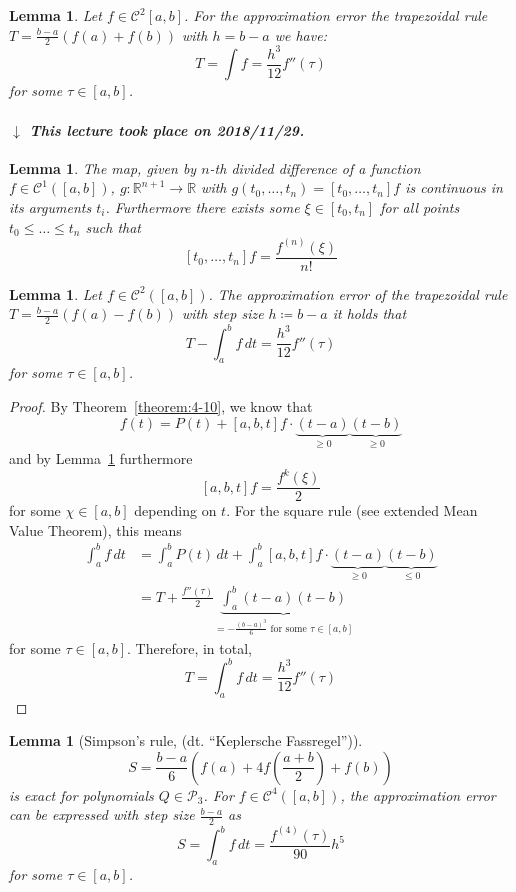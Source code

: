 \documentclass[a4paper]{article}
\newcounter{lecref}[section]
\numberwithin{lecref}{section}
\theoremstyle{break}
\newtheorem{lemma}[lecref]{Lemma}
\newtheorem*{Lemma}{Lemma}
\newcommand{\dateref}[1]{%
  \begin{mdframed}[backgroundcolor=gray!10,innerbottommargin=0pt,innertopmargin=0pt]
    \paragraph{\textit{$\downarrow$ This lecture took place on #1.}}%
  \end{mdframed}%
}
\newcommand{\dt}[1]{(dt. \enquote{\foreignlanguage{german}{#1}})}
\begin{document}
\begin{Lemma}
  \label{lemma:5-6}
  Let $f \in \mathcal C^2[a, b]$.
  For the approximation error the trapezoidal rule $T = \frac{b-a}{2} (f(a) + f(b))$ with $h = b - a$ we have:
  \[ T = \int f = \frac{h^3}{12} f''(\tau) \]
  for some $\tau \in [a, b]$.
\end{Lemma}

\dateref{2018/11/29}

\begin{lemma}
  \label{lemma:5-6}
  The map, given by $n$-th divided difference of a function $f \in \mathcal C^1([a, b])$, $g: \mathbb R^{n + 1} \to \mathbb R$ with $g(t_0, \dots, t_n) = [t_0, \dots, t_n] f$ is continuous in its arguments $t_i$. Furthermore there exists some $\xi \in [t_0, t_n]$ for all points $t_0 \leq \dots \leq t_n$ such that
  \[ [t_0, \dots, t_n] f = \frac{f^{(n)}(\xi)}{n!} \]
\end{lemma}

\begin{lemma}
  \label{lemma:5-7}
  Let $f \in \mathcal C^2([a,b])$. The approximation error of the trapezoidal rule $T = \frac{b - a}{2} (f(a) - f(b))$ with step size $h \coloneqq b - a$ it holds that
  \[ T - \int_a^b f \, dt = \frac{h^3}{12} f''(\tau) \]
  for some $\tau \in [a,b]$.
\end{lemma}

\begin{proof}
  By Theorem~\ref{theorem:4-10}, we know that
  \[ f(t) = P(t) + [a, b, t] f \cdot \underbrace{(t - a)}_{\geq 0} \underbrace{(t - b)}_{\geq 0} \]
  and by Lemma~\ref{lemma:5-6} furthermore
  \[ [a,b,t] f = \frac{f^k(\xi)}{2} \]
  for some $\chi \in [a,b]$ depending on $t$.
  For the square rule (see extended Mean Value Theorem), this means
  \begin{align*}
    \int_a^b f \, dt
      &= \int_a^b P(t) \, dt + \int_a^b [a, b, t] f \cdot \underbrace{(t - a)}_{\geq 0} \underbrace{(t - b)}_{\leq 0} \\
      &= T + \frac{f''(\tau)}{2} \underbrace{\int_a^b (t - a) (t - b)}_{= -\frac{(b - a)^3}{6} \text{ for some } \tau \in [a,b]}
  \end{align*}
  for some $\tau \in [a,b]$. Therefore, in total,
  \[ T = \int_a^b f \, dt = \frac{h^3}{12} f''(\tau) \]
\end{proof}

\begin{lemma}[Simpson's rule, \dt{Keplersche Fassregel}]
  \label{lemma:5-8}
  \[ S = \frac{b - a}{6} (f(a) + 4f\left(\frac{a + b}{2}\right) + f(b)) \]
  is exact for polynomials $Q \in \mathcal P_3$.
  For $f \in \mathcal C^4([a,b])$, the approximation error can be expressed with step size $\frac{b - a}{2}$ as
  \[ S = \int_a^b f \, dt = \frac{f^{(4)}(\tau)}{90} h^5 \]
  for some $\tau \in [a,b]$.
\end{lemma}
\end{document}
